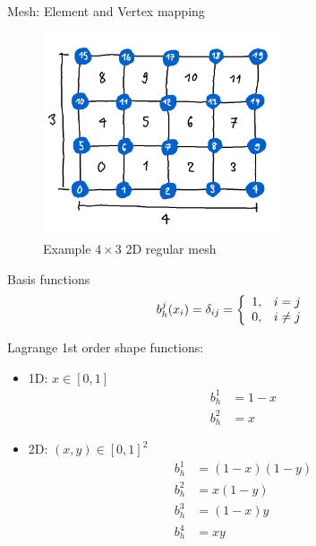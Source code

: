 \documentclass[handout,xcolor=pdftex,table,10pt,yellow,mathserif]{beamer}
\begin{document}
\begin{frame}{Mesh: Element and Vertex mapping}
    \begin{figure}
        \centering
        \includegraphics[height=6cm]{figures/Three Week Pres Notes/grid_2d.png}
        \caption{Example $4\times3$ 2D regular mesh}
    \end{figure}
\end{frame}

\begin{frame}{Basis functions}
    \begin{align*}
        b_h^j(x_i) = \delta_{ij} = \left\{ \begin{array}{l l} 1, & i = j\\ 0, & i \neq j \end{array}\right. %
    \end{align*}

    \pause

    Lagrange 1st order shape functions:
    \begin{itemize}
        \item 1D: $x \in [0, 1]$
            \begin{align*}
                b_h^1 &= 1 - x\\
                b_h^2 &= x
            \end{align*}
        \item 2D: $(x, y) \in [0, 1]^2$
            \begin{align*}
                b_h^1 &= (1 - x) (1 - y)\\
                b_h^2 &= x (1 - y)\\
                b_h^3 &= (1 - x) y\\
                b_h^4 &= x y
            \end{align*}
    \end{itemize}
    
\end{frame}
\end{document}
